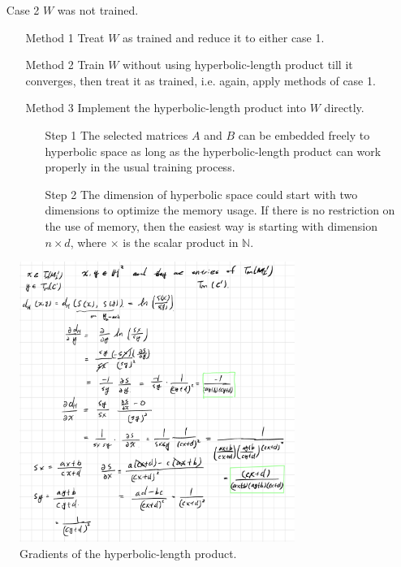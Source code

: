 \documentclass{article}
\theoremstyle{plain}
\theoremstyle{plain} %
\theoremstyle{definition}  %
\theoremstyle{remark}  %
\theoremstyle{plain}
\begin{document}
\begin{itemize}
\begin{itemize}
\item[Case 2] $W$ was not trained.
\begin{itemize}
\item[Method 1] Treat $W$ as trained and reduce it to either case 1.
\item[Method 2] Train $W$ without using hyperbolic-length product till it converges, then treat it as trained, i.e. again, apply methods of case 1.
\item[Method 3] Implement the hyperbolic-length product into $W$ directly.
\begin{itemize}
\item[Step 1] The selected matrices $A$ and $B$ can be embedded freely to hyperbolic space as long as the hyperbolic-length product can work properly in the usual training process.
\item[Step 2] The dimension of hyperbolic space could start with two dimensions to optimize the memory usage. If there is no restriction on the use of memory, then the easiest way is starting with dimension $n\times d$, where $\times$ is the scalar product in $\mathbb{N}$.
\end{itemize}
\end{itemize}
\end{itemize}
\end{itemize}

\begin{figure}[H]
\caption{Gradients of the hyperbolic-length product.}
\centering
\includegraphics[width=0.8\textwidth]{6.png}
\end{figure}
\end{document}
